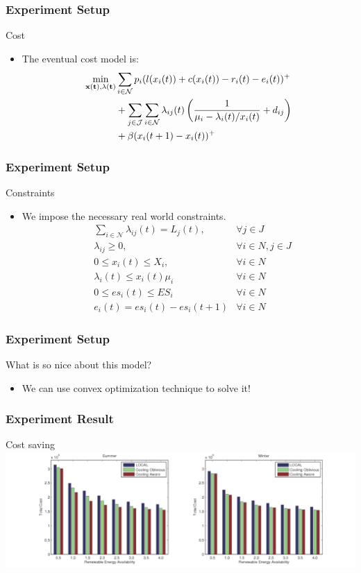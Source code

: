 \documentclass{beamer}
\begin{document}
\begin{frame}
\frametitle{Experiment Setup}
\begin{block}
{Cost}
\begin{itemize}
\item
The eventual cost model is:
\begin{align*}
\min_{\bf{x}(t), \bf{\lambda}(t)} & \sum_{i \in \mathcal{N}} p_i(l(x_i(t)) + c(x_i(t)) - r_i(t) - e_i(t))^+ \\
& + \sum_{j \in \mathcal{J}}\sum_{i \in \mathcal{N}}
\lambda_{ij}(t)\left(\frac{1}{\mu_i - \lambda_i(t)/x_i(t)} + d_{ij}\right) \\
& + \beta(x_i(t+1) - x_i(t))^+
\end{align*}
\end{itemize}
\end{block}
\end{frame}
%
%
\begin{frame}
\frametitle{Experiment Setup}
\begin{block}
{Constraints}
\begin{itemize}
\item
We impose the necessary real world constraints.
\begin{align*}
& \sum_{i\in \mathcal{N}}\lambda_{ij}(t) = L_j(t), &\forall j\in J  \\
& \lambda_{ij} \geq 0, & \forall i\in N, j\in J  \\
& 0 \leq x_i(t) \leq X_i, & \forall i \in N  \\
& \lambda_i(t) \leq x_i(t)\mu_i & \forall i \in N \\
& 0 \leq es_i(t) \leq ES_i & \forall i \in N \\
& e_i(t) = es_i(t) - es_i(t+1) & \forall i \in N
\end{align*}
\end{itemize}
\end{block}
\end{frame}
%
%
\begin{frame}
\frametitle{Experiment Setup}
\begin{block}
{What is so nice about this model?}
\begin{itemize}
\item
We can use convex optimization technique to solve it!
\end{itemize}
\end{block}
\end{frame}
%
%
\begin{frame}
\frametitle{Experiment Result}
\begin{block}
{Cost saving}
\includegraphics[scale = 0.37]{cost_comparison.pdf}
\end{block}
\end{frame}
\end{document}
